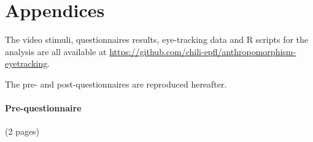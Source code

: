 \documentclass[lettersize, noapacite, twoside, HRI]{apa_HRI}
\begin{document}



\pagebreak
\appendix

\section{Appendices}

The video stimuli, questionnaires results, eye-tracking data and R scripts for
the analysis are all available at
\url{https://github.com/chili-epfl/anthropomorphism-eyetracking}.

The pre- and post-questionnaires are reproduced hereafter.
\vfill
\pagebreak
\paragraph{Pre-questionnaire} (2 pages)
\end{document}
